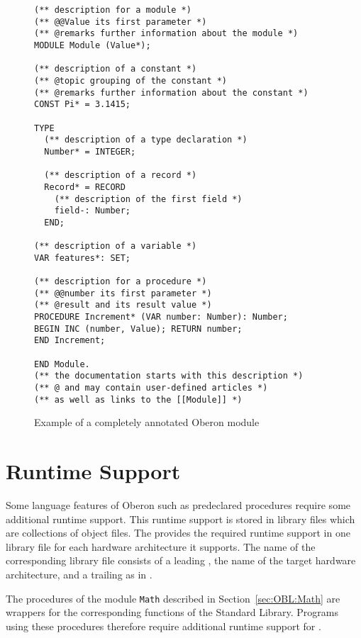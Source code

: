 \begin{figure}
\ttfamily\centering
\begin{minipage}{26em}\begin{verbatim}
(** description for a module *)
(** @@Value its first parameter *)
(** @remarks further information about the module *)
MODULE Module (Value*);

(** description of a constant *)
(** @topic grouping of the constant *)
(** @remarks further information about the constant *)
CONST Pi* = 3.1415;

TYPE
  (** description of a type declaration *)
  Number* = INTEGER;

  (** description of a record *)
  Record* = RECORD
    (** description of the first field *)
    field-: Number;
  END;

(** description of a variable *)
VAR features*: SET;

(** description for a procedure *)
(** @@number its first parameter *)
(** @result and its result value *)
PROCEDURE Increment* (VAR number: Number): Number;
BEGIN INC (number, Value); RETURN number;
END Increment;

END Module.
(** the documentation starts with this description *)
(** @ and may contain user-defined articles *)
(** as well as links to the [[Module]] *)
\end{verbatim}\end{minipage}
\normalfont\caption{Example of a completely annotated Oberon module}
\label{fig:obdocexample}
\end{figure}

\section{Runtime Support}\label{sec:obruntimesupport}

Some language features of Oberon such as predeclared procedures require some additional runtime support.
This runtime support is stored in library files which are collections of object files. \seeobject
The \ecs{} provides the required runtime support in one library file for each hardware architecture it supports.
The name of the corresponding library file consists of a leading , the name of the target hardware architecture, and a trailing  as in .

The procedures of the module \texttt{Math} described in Section~\ref{sec:OBL:Math} are wrappers for the corresponding functions of the Standard \cpp{} Library.
Programs using these procedures therefore require additional runtime support for \cpp{}. \seecpp

